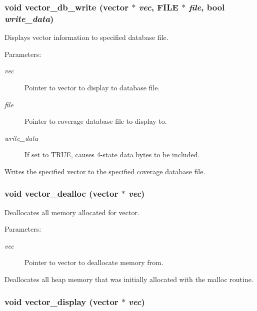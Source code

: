 \subsubsection{\setlength{\rightskip}{0pt plus 5cm}void vector\_\-db\_\-write ({\bf vector} $\ast$ {\em vec}, FILE $\ast$ {\em file}, {\bf bool} {\em write\_\-data})}\label{vector_8c_a11}


Displays vector information to specified database file. 

\begin{Desc}
\item[Parameters:]
\begin{description}
\item[{\em vec}]Pointer to vector to display to database file. \item[{\em file}]Pointer to coverage database file to display to. \item[{\em write\_\-data}]If set to TRUE, causes 4-state data bytes to be included.\end{description}
\end{Desc}
Writes the specified vector to the specified coverage database file. 
\subsubsection{\setlength{\rightskip}{0pt plus 5cm}void vector\_\-dealloc ({\bf vector} $\ast$ {\em vec})}\label{vector_8c_a46}


Deallocates all memory allocated for vector. 

\begin{Desc}
\item[Parameters:]
\begin{description}
\item[{\em vec}]Pointer to vector to deallocate memory from.\end{description}
\end{Desc}
Deallocates all heap memory that was initially allocated with the malloc routine. 
\subsubsection{\setlength{\rightskip}{0pt plus 5cm}void vector\_\-display ({\bf vector} $\ast$ {\em vec})}\label{vector_8c_a17}


